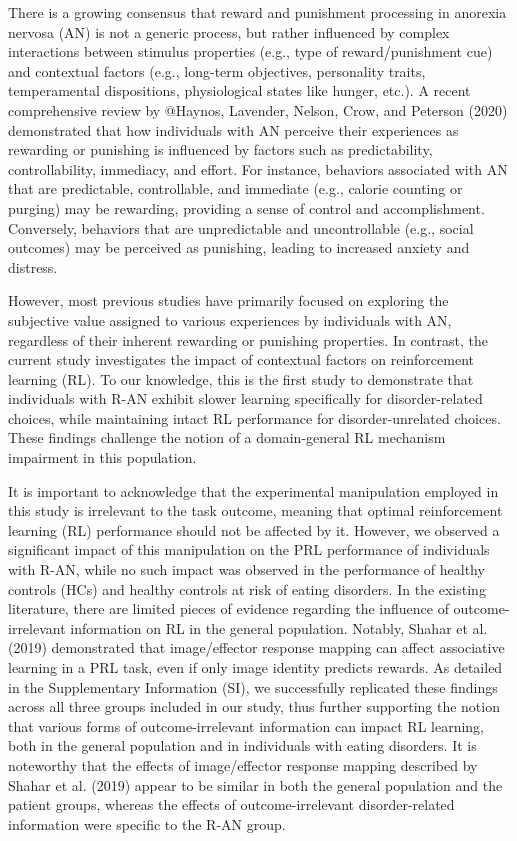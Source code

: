 \documentclass[
  man,floatsintext]{apa6}
\begin{document}
There is a growing consensus that reward and punishment processing in anorexia nervosa (AN) is not a generic process, but rather influenced by complex interactions between stimulus properties (e.g., type of reward/punishment cue) and contextual factors (e.g., long-term objectives, personality traits, temperamental dispositions, physiological states like hunger, etc.). A recent comprehensive review by @Haynos, Lavender, Nelson, Crow, and Peterson (2020) demonstrated that how individuals with AN perceive their experiences as rewarding or punishing is influenced by factors such as predictability, controllability, immediacy, and effort. For instance, behaviors associated with AN that are predictable, controllable, and immediate (e.g., calorie counting or purging) may be rewarding, providing a sense of control and accomplishment. Conversely, behaviors that are unpredictable and uncontrollable (e.g., social outcomes) may be perceived as punishing, leading to increased anxiety and distress.

However, most previous studies have primarily focused on exploring the subjective value assigned to various experiences by individuals with AN, regardless of their inherent rewarding or punishing properties. In contrast, the current study investigates the impact of contextual factors on reinforcement learning (RL). To our knowledge, this is the first study to demonstrate that individuals with R-AN exhibit slower learning specifically for disorder-related choices, while maintaining intact RL performance for disorder-unrelated choices. These findings challenge the notion of a domain-general RL mechanism impairment in this population.

It is important to acknowledge that the experimental manipulation employed in this study is irrelevant to the task outcome, meaning that optimal reinforcement learning (RL) performance should not be affected by it. However, we observed a significant impact of this manipulation on the PRL performance of individuals with R-AN, while no such impact was observed in the performance of healthy controls (HCs) and healthy controls at risk of eating disorders. In the existing literature, there are limited pieces of evidence regarding the influence of outcome-irrelevant information on RL in the general population. Notably, Shahar et al. (2019) demonstrated that image/effector response mapping can affect associative learning in a PRL task, even if only image identity predicts rewards. As detailed in the Supplementary Information (SI), we successfully replicated these findings across all three groups included in our study, thus further supporting the notion that various forms of outcome-irrelevant information can impact RL learning, both in the general population and in individuals with eating disorders. It is noteworthy that the effects of image/effector response mapping described by Shahar et al. (2019) appear to be similar in both the general population and the patient groups, whereas the effects of outcome-irrelevant disorder-related information were specific to the R-AN group.
\end{document}
